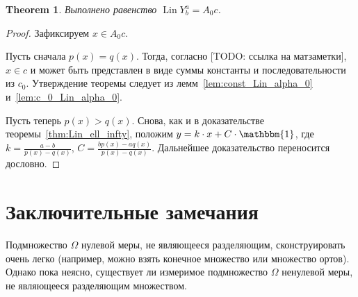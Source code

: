 \documentclass[a4paper,14pt]{article} %
\theoremstyle{plain}
\newtheorem{theorem}{Theorem}[section]
\theoremstyle{definition}
\begin{document}
\begin{theorem}
	Выполнено равенство $\operatorname{Lin} Y^a_b = A_0 c$.
\end{theorem}

\begin{proof}
	Зафиксируем $x \in A_0 c$.

	Пусть сначала $p(x) = q(x)$.
	Тогда, согласно
	[TODO: ссылка на матзаметки],
	$x\in c$
	и может быть представлен в виде суммы константы и последовательности из $c_0$.
	Утверждение теоремы следует из лемм~\ref{lem:const_Lin_alpha_0} и~\ref{lem:c_0_Lin_alpha_0}.

	Пусть теперь $p(x) > q(x)$.
	Снова, как и в доказательстве теоремы~\ref{thm:Lin_ell_infty},
	положим $y=k\cdot x + C\cdot\mathbbm{1}$,
	где $k=\frac{a-b}{p(x)-q(x)}$, $C=\frac{bp(x)-aq(x)}{p(x)-q(x)}$.
	Дальнейшее доказательство переносится дословно.
\end{proof}



\section{Заключительные замечания}
Подмножество $\Omega$ нулевой меры, не являющееся разделяющим, сконструировать очень легко
(например, можно взять конечное множество или множество ортов).
Однако пока неясно, существует ли измеримое подмножество $\Omega$ ненулевой меры,
не являющееся разделяющим множеством.


\printbibliography
\end{document}
